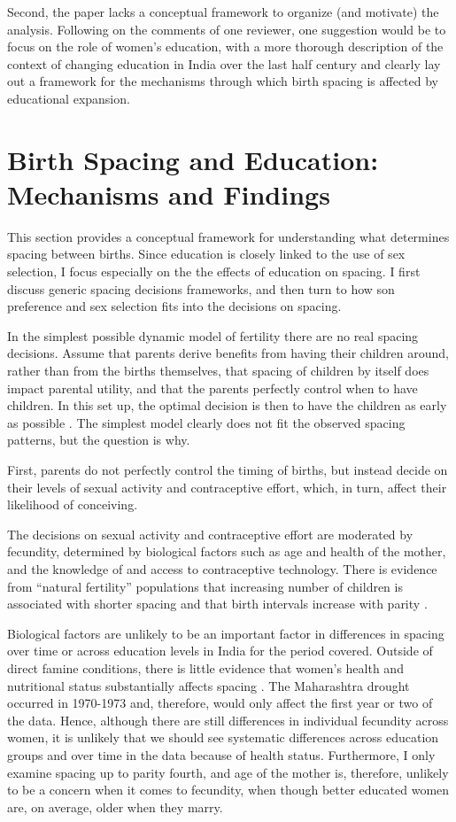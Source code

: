 Second, the paper lacks a conceptual framework to organize (and
motivate) the analysis. Following on the comments of one reviewer, one
suggestion would be to focus on the role of women’s education, with a
more thorough description of the context of changing education in India
over the last half century and clearly lay out a framework for the
mechanisms through which birth spacing is affected by educational
expansion.

\section{Birth Spacing and Education: Mechanisms and Findings}

This section provides a conceptual framework for understanding what determines spacing 
between births.
Since education is closely linked to the use of sex selection, I focus especially on the
the effects of education on spacing.
I first discuss generic spacing decisions frameworks, and then turn to how son preference
and sex selection fits into the decisions on spacing.

In the simplest possible dynamic model of fertility there are no real spacing decisions.
Assume that parents derive benefits from having their children around, rather than from 
the births themselves, that spacing of children by itself does impact parental utility, 
and that the parents perfectly control when to have children. 
In this set up, the optimal decision is then to have the children as early as possible 
\citep{Newman1988}.
The simplest model clearly does not fit the observed spacing patterns, but the question 
is why.

First, parents do not perfectly control the timing of births, but instead decide on their
levels of sexual activity and contraceptive effort, which, in turn, affect their likelihood 
of conceiving.

The decisions on sexual activity and contraceptive effort are moderated by fecundity,
determined by biological factors such as age and health of the mother, and the knowledge of and 
access to contraceptive technology.
There is evidence from ``natural fertility'' populations that increasing number of 
children is associated with shorter spacing and that birth intervals increase 
with parity \citep{Henry1961,Leridon1977}.


Biological factors are unlikely to be an important factor in differences in spacing over 
time or across education levels in India for the period covered.
Outside of direct famine conditions, there is little evidence that women's health and 
nutritional status substantially affects spacing \citep{Huffman1987,John1987,lindstrom99}.
The Maharashtra drought occurred in 1970-1973 and, therefore, would only affect the first
year or two of the data.
Hence, although there are still differences in individual fecundity across women, it is
unlikely that we should see systematic differences across education groups and over time
in the data because of health status.
Furthermore, I only examine spacing up to parity fourth, and age of the mother is,
therefore, unlikely to be a concern when it comes to fecundity, when though better 
educated women are, on average, older when they marry. 


